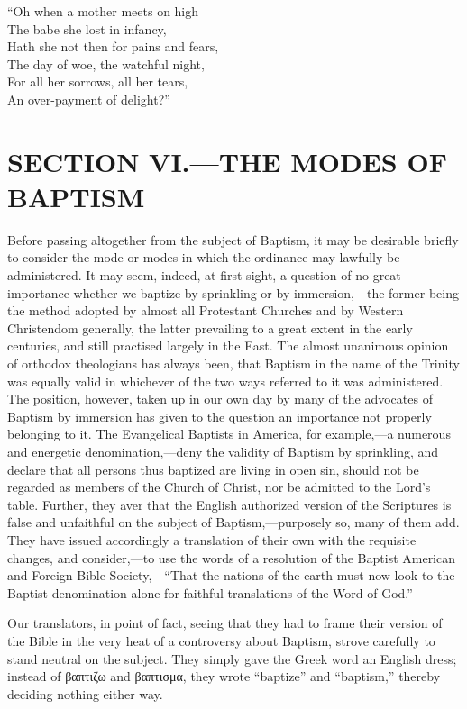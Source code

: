 \documentclass[]{book}
\begin{document}
``Oh when a mother meets on high\\
The babe she lost in infancy,\\
Hath she not then for pains and fears,\\
The day of woe, the watchful night,\\
For all her sorrows, all her tears,\\
An over-payment of delight?''

\hypertarget{section-vi.the-modes-of-baptism}{%
\section{SECTION VI.---THE MODES OF BAPTISM}\label{section-vi.the-modes-of-baptism}}

Before passing altogether from the subject of Baptism, it may be desirable briefly to consider the mode or modes in which the ordinance may lawfully be administered. It may seem, indeed, at first sight, a question of no great importance whether we baptize by sprinkling or by immersion,---the former being the method adopted by almost all Protestant Churches and by Western Christendom generally, the latter prevailing to a great extent in the early centuries, and still practised largely in the East. The almost unanimous opinion of orthodox theologians has always been, that Baptism in the name of the Trinity was equally valid in whichever of the two ways referred to it was administered. The position, however, taken up in our own day by many of the advocates of Baptism by immersion has given to the question an importance not properly belonging to it. The Evangelical Baptists in America, for example,---a numerous and energetic denomination,---deny the validity of Baptism by sprinkling, and declare that all persons thus baptized are living in open sin, should not be regarded as members of the Church of Christ, nor be admitted to the Lord's table. Further, they aver that the English authorized version of the Scriptures is false and unfaithful on the subject of Baptism,---purposely so, many of them add. They have issued accordingly a translation of their own with the requisite changes, and consider,---to use the words of a resolution of the Baptist American and Foreign Bible Society,---``That the nations of the earth must now look to the Baptist denomination alone for faithful translations of the Word of God.''

Our translators, in point of fact, seeing that they had to frame their version of the Bible in the very heat of a controversy about Baptism, strove carefully to stand neutral on the subject. They simply gave the Greek word an English dress; instead of βαπτιζω and βαπτισμα, they wrote ``baptize'' and ``baptism,'' thereby deciding nothing either way.
\end{document}
